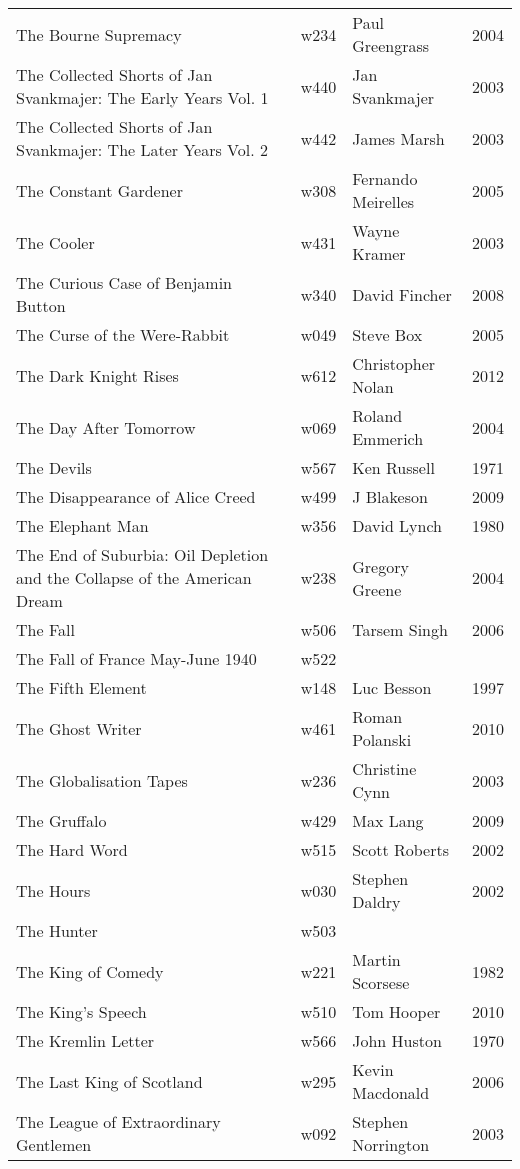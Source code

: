 \documentclass{article}
\begin{document}
\begin {center}
\begin{longtable}{p{10cm} l l l}
The Bourne Supremacy & w234 & Paul Greengrass & 2004 \\
The Collected Shorts of Jan Svankmajer: The Early Years Vol. 1 & w440 & Jan Svankmajer & 2003 \\
The Collected Shorts of Jan Svankmajer: The Later Years Vol. 2 & w442 & James Marsh & 2003 \\
The Constant Gardener & w308 & Fernando Meirelles & 2005 \\
The Cooler & w431 & Wayne Kramer & 2003 \\
The Curious Case of Benjamin Button & w340 & David Fincher & 2008 \\
The Curse of the Were-Rabbit & w049 & Steve Box & 2005 \\
The Dark Knight Rises & w612 & Christopher Nolan & 2012 \\
The Day After Tomorrow & w069 & Roland Emmerich & 2004 \\
The Devils & w567 & Ken Russell & 1971 \\
The Disappearance of Alice Creed & w499 & J Blakeson & 2009 \\
The Elephant Man & w356 & David Lynch & 1980 \\
The End of Suburbia: Oil Depletion and the Collapse of the American Dream & w238 & Gregory Greene & 2004 \\
The Fall & w506 & Tarsem Singh & 2006 \\
The Fall of France May-June 1940 & w522 &  &  \\
The Fifth Element & w148 & Luc Besson & 1997 \\
The Ghost Writer & w461 & Roman Polanski & 2010 \\
The Globalisation Tapes & w236 & Christine Cynn & 2003 \\
The Gruffalo & w429 & Max Lang & 2009 \\
The Hard Word & w515 & Scott Roberts & 2002 \\
The Hours & w030 & Stephen Daldry & 2002 \\
The Hunter & w503 &  &  \\
The King of Comedy & w221 & Martin Scorsese & 1982 \\
The King's Speech & w510 & Tom Hooper & 2010 \\
The Kremlin Letter & w566 & John Huston & 1970 \\
The Last King of Scotland & w295 & Kevin Macdonald & 2006 \\
The League of Extraordinary Gentlemen & w092 & Stephen Norrington & 2003 \\

\end{longtable}
\end{center}
\end{document}
